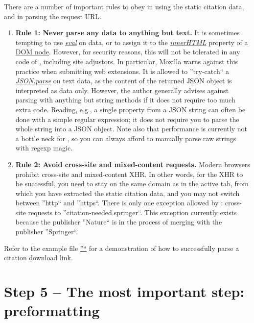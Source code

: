 \documentclass[
a4paper,
12pt,
]
{article}
\begin{document}
There are a number of important rules to obey in using the static citation data, and in parsing the request URL.
\begin{enumerate}
 \item \textbf{Rule 1: Never parse any data to anything but text.} 
 It is sometimes tempting to use \href{https://en.wikipedia.org/wiki/XMLHttpRequest#The_open_method}{\textit{eval}} on data, or to assign it to the \href{https://developer.mozilla.org/en-US/docs/Web/API/Element/innerHTML}{\textit{innerHTML}} property of a \href{https://www.w3schools.com/jsref/dom_obj_attributes.asp}{DOM node}. However, for security reasons, this will not be tolerated in any code of {\plgname}, including site adjustors. In particular, Mozilla warns against this practice when submitting web extensions.
 It is allowed to ''try-catch`` a \href{https://www.w3schools.com/jsref/dom_obj_attributes.asp}{\textit{JSON.parse}} on text data, as the content of the returned JSON object is interpreted as data only. 
 However, the author generally advises against parsing with anything but string methods if it does not require too much extra code. Reading, e.g., a single property from a JSON string can often be done with a simple regular expression; it does not require you to parse the whole string into a JSON object. Note also that performance is currently not a bottle neck for {\plgname}, so you can always afford to manually parse raw strings with regexp magic.
 
 \item \textbf{Rule 2: Avoid cross-site and mixed-content requests.} Modern browsers prohibit cross-site and mixed-content XHR. In other words, for the XHR to be successful, you need to stay on the same domain as in the active tab, from which you have extracted the static citation data, and you may not switch between ''http`` and ''https``. There is only one exception allowed by {\plgname} : cross-site requests to ''citation-needed.springer``. This exception currently exists because the publisher ''Nature`` is in the process of merging with the publisher ''Springer``.
 
\end{enumerate}

Refer to the example file \href{https://github.com/Langenscheiss/bibitnow/blob/master/extractors/prefselectors/0_EXAMPLE.js}{''\exmpl``} for a demonstration of how to successfully parse a citation download link.

\section{Step 5 -- The most important step: preformatting}\label{sec_5}
\end{document}
